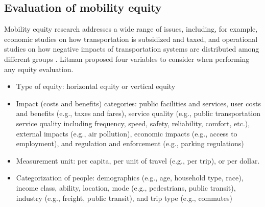 \documentclass[11pt]{article}
\begin{document}

\subsection{Evaluation of mobility equity}

Mobility equity research addresses a wide range of issues, including, for example, economic studies on how transportation is subsidized and taxed, and operational studies on how negative impacts of transportation systems are distributed among different groups \cite{shaheen2017travel}. Litman \cite{litman2018evaluating} proposed four variables to consider when performing any equity evaluation.
\begin{itemize}
\item Type of equity: horizontal equity or vertical equity
\item Impact (costs and benefits) categories: public facilities and services, user costs and benefits (e.g., taxes and fares), service quality (e.g., public transportation service quality including frequency, speed, safety, reliability, comfort, etc.), external impacts (e.g., air pollution), economic impacts (e.g., access to employment), and regulation and enforcement (e.g., parking regulations)
\item Measurement unit: per capita, per unit of travel (e.g., per trip), or per dollar. 
\item Categorization of people: demographics (e.g., age, household type, race), income class, ability, location, mode (e.g., pedestrians, public transit), industry (e.g., freight, public transit), and trip type (e.g., commutes)
\end{itemize}
\end{document}
